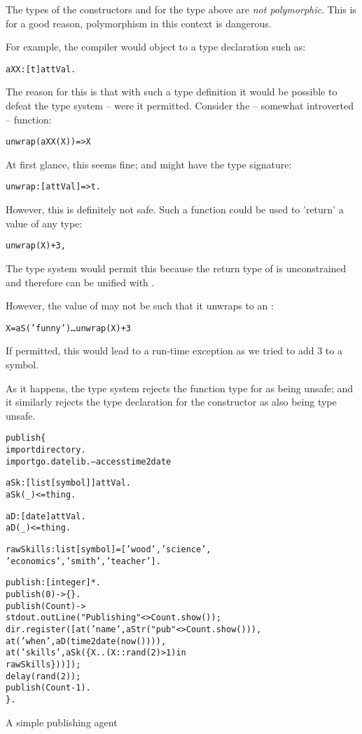 \begin{aside}[\dbend\dbend]
The types of the constructors  and  for the  type above are \emph{not polymorphic}. This is for a good reason, polymorphism in this context is dangerous.

For example, the \go compiler would object to a type declaration such as:
\begin{alltt}
aXX:[t]\conarrow{}attVal.
\end{alltt}
The reason for this is that with such a type definition it would be possible to defeat the type system -- were it permitted. Consider the -- somewhat introverted -- function:
\begin{alltt}
unwrap(aXX(X))=>X
\end{alltt}
At first glance, this seems fine; and might have the type signature:
\begin{alltt}
unwrap:[attVal]=>t.
\end{alltt}
However, this is definitely not safe. Such a function could be used to 'return' a value of any type:
\begin{alltt}
unwrap(X)+3,
\end{alltt}
The type system would permit this because the return type of  is unconstrained and therefore can be unified with .

However, the value of  may not be such that it unwraps to an :
\begin{alltt}
X = aS('funny')\ldots{}unwrap(X)+3
\end{alltt}
If permitted, this would lead to a run-time exception as we tried to add 3 to a symbol.

As it happens, the \go type system rejects the function type for  as being unsafe; and it similarly rejects the type declaration for the  constructor as also being type unsafe.
\end{aside}



\begin{program}[tb]
\vspace{0.5ex}
\begin{alltt}
publish\{
  import directory.
  import go.datelib.   -- access time2date
  
  aSk:[list[symbol]]\conarrow{}attVal.
  aSk(_)<=thing.

  aD:[date]\conarrow{}attVal.
  aD(_)<=thing.
  
  rawSkills:list[symbol]=['wood','science',
                          'economics','smith','teacher'].

  publish:[integer]*.
  publish(0) -> \{\}.
  publish(Count) ->
      stdout.outLine("Publishing "<>Count.show());
      dir.register([at('name',aStr("pub "<>Count.show())),
                    at('when',aD(time2date(now()))),
                    at('skills',aSk(\{X .. (X::rand(2)>1) in 
                                       rawSkills\}))]);
      delay(rand(2));
      publish(Count-1).
\}.
\end{alltt}
\vspace{-2ex}
\caption{A simple publishing agent}
\label{directory:publish}
\end{program}


